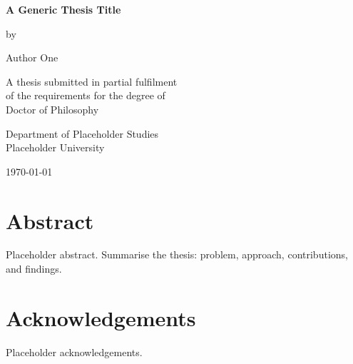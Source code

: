 \documentclass[12pt,a4paper,oneside]{report}
\begin{document}
\begin{titlepage}
  \centering
  \vspace*{2cm}
  {\LARGE\bfseries A Generic Thesis Title\par}
  \vspace{1.5cm}
  {\large by\par}
  \vspace{0.5cm}
  {\large Author One\par}
  \vfill
  {\large A thesis submitted in partial fulfilment\\
   of the requirements for the degree of\\
   Doctor of Philosophy\par}
  \vspace{1cm}
  {\large Department of Placeholder Studies\\
   Placeholder University\par}
  \vspace{1cm}
  {\large \today\par}
\end{titlepage}

\onehalfspacing

\chapter*{Abstract}
Placeholder abstract. Summarise the thesis: problem, approach, contributions,
and findings.

\chapter*{Acknowledgements}
Placeholder acknowledgements.

\tableofcontents
\listoffigures
\listoftables

\clearpage
{}
\end{document}

